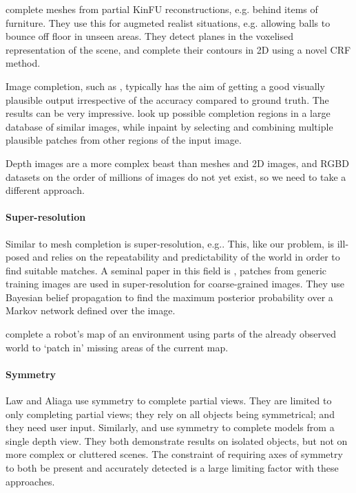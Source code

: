 \documentclass[10pt,twocolumn,letterpaper]{article}
\makeatletter
\renewcommand*{\eg}{e.g.\@\xspace}
\makeatother
\begin{document}
\cite{silberman-eccv-2014} complete meshes from partial KinFU reconstructions, \eg behind items of furniture.
They use this for augmeted realist situations, \eg allowing balls to bounce off floor in unseen areas.
They detect planes in the voxelised representation of the scene, and complete their contours in 2D using a novel CRF method.

Image completion, such as \cite{hays-siggraph-2007, criminisi-cvpr-2003}, typically has the aim of getting a good visually plausible output irrespective of the accuracy compared to ground truth. 
The results can be very impressive. 
\cite{hays-siggraph-2007} look up possible completion regions in a large database of similar images, while \cite{criminisi-cvpr-2003} inpaint by selecting and combining multiple plausible patches from other regions of the input image.

Depth images are a more complex beast than meshes and 2D images, and RGBD datasets on the order of millions of images do not yet exist, so we need to take a different approach.

\paragraph{Super-resolution}
Similar to mesh completion is super-resolution, \eg \cite{macaodha-eccv-2012}. 
This, like our problem, is ill-posed and relies on the repeatability and predictability of the world in order to find suitable matches.
A seminal paper in this field is \cite{freeman-ijcv-2000}, patches from generic training images are used in super-resolution for coarse-grained images. They use Bayesian belief propagation to find the maximum posterior probability over a Markov network defined over the image.

\cite{chang-tor-2007} complete a robot's map of an environment using parts of the already observed world to  `patch in' missing areas of the current map.

\paragraph{Symmetry}
Law and Aliaga \cite{law-cviu-2010} use symmetry to complete partial views. 
They are limited to only completing partial views; they rely on all objects being symmetrical; and they need user input.
Similarly, \cite{thrun-iccv-2005} and \cite{kroemer-humanoids-2012} use symmetry to complete models from a single depth view. 
They both demonstrate results on isolated objects, but not on more complex or cluttered scenes. 
The constraint of requiring axes of symmetry to both be present and accurately detected is a large limiting factor with these approaches.
\end{document}
